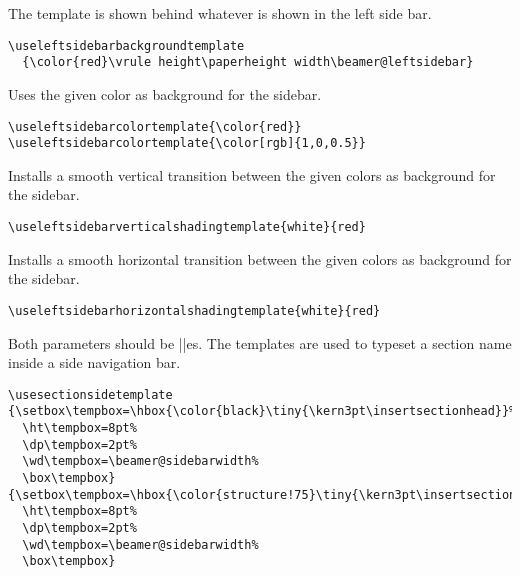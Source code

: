 \begin{command}{\useleftsidebarbackgroundtemplate{}}
  The template is shown behind whatever is shown in the left side
  bar. 
  \example
\begin{verbatim}
\useleftsidebarbackgroundtemplate
  {\color{red}\vrule height\paperheight width\beamer@leftsidebar}
\end{verbatim}
\end{command}


\begin{command}{\useleftsidebarcolortemplate{}}
  Uses the given color as background for the sidebar.
  \example
\begin{verbatim}
\useleftsidebarcolortemplate{\color{red}}
\useleftsidebarcolortemplate{\color[rgb]{1,0,0.5}}
\end{verbatim}
\end{command}

\begin{command}{\useleftsidebarverticalshadingtemplate{}}
  Installs a smooth vertical transition between the given colors as
  background for the sidebar.
  \example
\begin{verbatim}
\useleftsidebarverticalshadingtemplate{white}{red}
\end{verbatim}
\end{command}


\begin{command}{\useleftsidebarhorizontalshadingtemplate{}}
  Installs a smooth horizontal transition between the given colors as
  background for the sidebar.
  \example
\begin{verbatim}
\useleftsidebarhorizontalshadingtemplate{white}{red}
\end{verbatim}
\end{command}


\begin{command}{\usesectionsidetemplate{}}
  Both parameters should be |\hbox|es. The templates are used to
  typeset a section name inside a side navigation bar.
  \example
\begin{verbatim}
\usesectionsidetemplate
{\setbox\tempbox=\hbox{\color{black}\tiny{\kern3pt\insertsectionhead}}%
  \ht\tempbox=8pt%
  \dp\tempbox=2pt%
  \wd\tempbox=\beamer@sidebarwidth%
  \box\tempbox}
{\setbox\tempbox=\hbox{\color{structure!75}\tiny{\kern3pt\insertsectionhead}}%
  \ht\tempbox=8pt%
  \dp\tempbox=2pt%
  \wd\tempbox=\beamer@sidebarwidth%
  \box\tempbox}
\end{verbatim}
\end{command}




